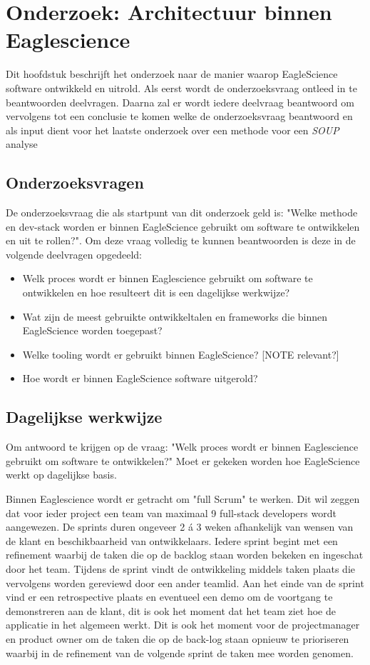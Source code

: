 \chapter{Onderzoek: Architectuur binnen Eaglescience}\label{ch:onderzoek:-architectuur-binnen-eaglescience}

Dit hoofdstuk beschrijft het onderzoek naar de manier waarop EagleScience software ontwikkeld en uitrold. Als eerst wordt de onderzoeksvraag ontleed in te beantwoorden deelvragen. Daarna zal er wordt iedere deelvraag beantwoord om vervolgens tot een conclusie te komen welke de onderzoeksvraag beantwoord en als input dient voor het laatste onderzoek over een methode voor een \textit{SOUP} analyse

\section{Onderzoeksvragen}\label{sec:ESOnderzoeksVraag}
De onderzoeksvraag die als startpunt van dit onderzoek geld is: "Welke methode en dev-stack worden er binnen EagleScience gebruikt om software te ontwikkelen en uit te rollen?". Om deze vraag volledig te kunnen beantwoorden is deze in de volgende deelvragen opgedeeld:
\begin{itemize}
    \item Welk proces wordt er binnen Eaglescience gebruikt om software te ontwikkelen en hoe resulteert dit is een dagelijkse werkwijze?
    \item Wat zijn de meest gebruikte ontwikkeltalen en frameworks die binnen EagleScience worden toegepast?
    \item Welke tooling wordt er gebruikt binnen EagleScience? [NOTE relevant?]
    \item Hoe wordt er binnen EagleScience software uitgerold?
\end{itemize}


\section{Dagelijkse werkwijze}\label{sec:dagelijkse-werkwijze}
Om antwoord te krijgen op de vraag: "Welk proces wordt er binnen Eaglescience gebruikt om software te ontwikkelen?" Moet er gekeken worden hoe EagleScience werkt op dagelijkse basis.

Binnen Eaglescience wordt er getracht om "full Scrum" te werken. Dit wil zeggen dat voor ieder project een team van maximaal 9 full-stack developers wordt aangewezen. De sprints duren ongeveer 2 á 3 weken afhankelijk van wensen van de klant en beschikbaarheid van ontwikkelaars. Iedere sprint begint met een refinement waarbij de taken die op de backlog staan worden bekeken en ingeschat door het team. Tijdens de sprint vindt de ontwikkeling middels taken plaats die vervolgens worden gereviewd door een ander teamlid. Aan het einde van de sprint vind er een retrospective plaats en eventueel een demo om de voortgang te demonstreren aan de klant, dit is ook het moment dat het team ziet hoe de applicatie in het algemeen werkt. Dit is ook het moment voor de projectmanager en product owner om de taken die op de back-log staan opnieuw te prioriseren waarbij in de refinement van de volgende sprint de taken mee worden genomen.


